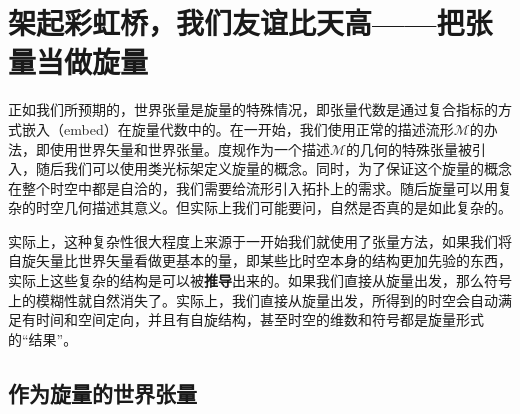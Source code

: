 \chapter{架起彩虹桥，我们友谊比天高——把张量当做旋量}

正如我们所预期的，世界张量是旋量的特殊情况，即张量代数是通过复合指标的方式嵌入（embed）在旋量代数中的。在一开始，我们使用正常的描述流形$\mathcal{M}$的办法，即使用世界矢量和世界张量。度规作为一个描述$\mathcal{M}$的几何的特殊张量被引入，随后我们可以使用类光标架定义旋量的概念。同时，为了保证这个旋量的概念在整个时空中都是自洽的，我们需要给流形引入拓扑上的需求。随后旋量可以用复杂的时空几何描述其意义。但实际上我们可能要问，自然是否真的是如此复杂的。



实际上，这种复杂性很大程度上来源于一开始我们就使用了张量方法，如果我们将自旋矢量比世界矢量看做更基本的量，即某些比时空本身的结构更加先验的东西，实际上这些复杂的结构是可以被\textbf{推导}出来的。如果我们直接从旋量出发，那么符号上的模糊性就自然消失了。实际上，我们直接从旋量出发，所得到的时空会自动满足有时间和空间定向，并且有自旋结构，甚至时空的维数和符号都是旋量形式的“结果”。


\section{作为旋量的世界张量}

